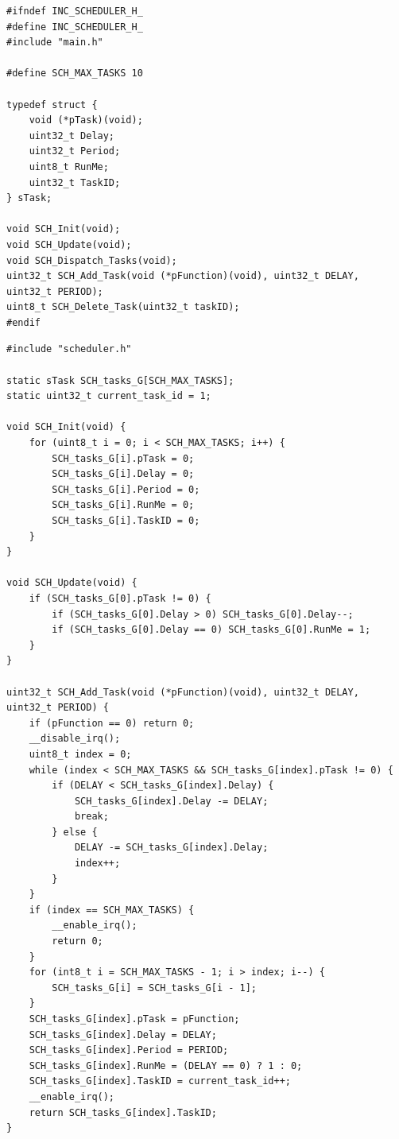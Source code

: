 \documentclass[12pt,a4paper]{article}
\begin{document}
\begin{lstlisting}[caption={\texttt{scheduler.h}}]
#ifndef INC_SCHEDULER_H_
#define INC_SCHEDULER_H_
#include "main.h"

#define SCH_MAX_TASKS 10

typedef struct {
    void (*pTask)(void);
    uint32_t Delay;
    uint32_t Period;
    uint8_t RunMe;
    uint32_t TaskID;
} sTask;

void SCH_Init(void);
void SCH_Update(void);
void SCH_Dispatch_Tasks(void);
uint32_t SCH_Add_Task(void (*pFunction)(void), uint32_t DELAY, uint32_t PERIOD);
uint8_t SCH_Delete_Task(uint32_t taskID);
#endif
\end{lstlisting}

\newpage

\begin{lstlisting}[caption={\texttt{scheduler.c}}]
#include "scheduler.h"

static sTask SCH_tasks_G[SCH_MAX_TASKS];
static uint32_t current_task_id = 1;

void SCH_Init(void) {
    for (uint8_t i = 0; i < SCH_MAX_TASKS; i++) {
        SCH_tasks_G[i].pTask = 0;
        SCH_tasks_G[i].Delay = 0;
        SCH_tasks_G[i].Period = 0;
        SCH_tasks_G[i].RunMe = 0;
        SCH_tasks_G[i].TaskID = 0;
    }
}

void SCH_Update(void) {
    if (SCH_tasks_G[0].pTask != 0) {
        if (SCH_tasks_G[0].Delay > 0) SCH_tasks_G[0].Delay--;
        if (SCH_tasks_G[0].Delay == 0) SCH_tasks_G[0].RunMe = 1;
    }
}

uint32_t SCH_Add_Task(void (*pFunction)(void), uint32_t DELAY, uint32_t PERIOD) {
    if (pFunction == 0) return 0;
    __disable_irq();
    uint8_t index = 0;
    while (index < SCH_MAX_TASKS && SCH_tasks_G[index].pTask != 0) {
        if (DELAY < SCH_tasks_G[index].Delay) {
            SCH_tasks_G[index].Delay -= DELAY;
            break;
        } else {
            DELAY -= SCH_tasks_G[index].Delay;
            index++;
        }
    }
    if (index == SCH_MAX_TASKS) {
        __enable_irq();
        return 0;
    }
    for (int8_t i = SCH_MAX_TASKS - 1; i > index; i--) {
        SCH_tasks_G[i] = SCH_tasks_G[i - 1];
    }
    SCH_tasks_G[index].pTask = pFunction;
    SCH_tasks_G[index].Delay = DELAY;
    SCH_tasks_G[index].Period = PERIOD;
    SCH_tasks_G[index].RunMe = (DELAY == 0) ? 1 : 0;
    SCH_tasks_G[index].TaskID = current_task_id++;
    __enable_irq();
    return SCH_tasks_G[index].TaskID;
}


\end{lstlisting}
\end{document}
